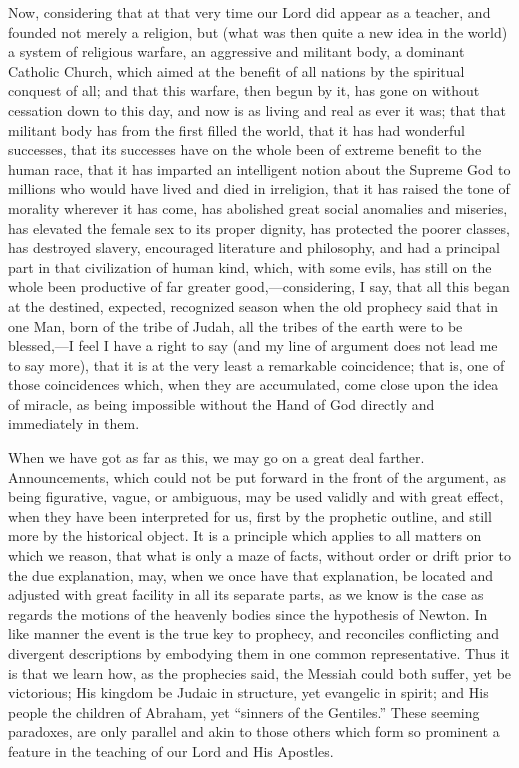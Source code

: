 Now, considering that at that very time our Lord did appear as a
teacher, and founded not merely a religion, but (what was then quite a
new idea in the world) a system of religious warfare, an aggressive
and militant body, a dominant Catholic Church, which aimed at the
benefit of all nations by the spiritual conquest of all; and that this
warfare, then begun by it, has gone on without cessation down to this
day, and now is as living and real as ever it was; that that militant
body has from the first filled the world, that it has had wonderful
successes, that its successes have on the whole been of extreme
benefit to the human race, that it has imparted an intelligent notion
about the Supreme God to millions who would have lived and died
in irreligion, that it has raised the tone of morality wherever it has
come, has abolished great social anomalies and miseries, has elevated
the female sex to its proper dignity, has protected the poorer
classes, has destroyed slavery, encouraged literature and philosophy,
and had a principal part in that civilization of human kind, which,
with some evils, has still on the whole been productive of far greater
good,—considering, I say, that all this began at the destined,
expected, recognized season when the old prophecy said that in one
Man, born of the tribe of Judah, all the tribes of the earth were to
be blessed,—I feel I have a right to say (and my line of argument
does not lead me to say more), that it is at the very least a
remarkable coincidence; that is, one of those coincidences which, when
they are accumulated, come close upon the idea of miracle, as being
impossible without the Hand of God directly and immediately in them.

When we have got as far as this, we may go on a great deal farther.
Announcements, which could not be put forward in the front of the
argument, as being figurative, vague, or ambiguous, may be used
validly and with great effect, when they have been interpreted for us,
first by the prophetic outline, and still more by the historical
object. It is a principle which applies to all matters on which we
reason, that what is only a maze of facts, without order or drift
prior to the due explanation, may, when we once have that explanation,
be located and adjusted with great facility in all its separate parts,
as we know is the case as regards the motions of the heavenly
bodies since the hypothesis of Newton. In like manner the event is the
true key to prophecy, and reconciles conflicting and divergent
descriptions by embodying them in one common representative. Thus it
is that we learn how, as the prophecies said, the Messiah could both
suffer, yet be victorious; His kingdom be Judaic in structure, yet
evangelic in spirit; and His people the children of Abraham, yet
``sinners of the Gentiles.'' These seeming paradoxes, are only
parallel and akin to those others which form so prominent a feature in
the teaching of our Lord and His Apostles.

